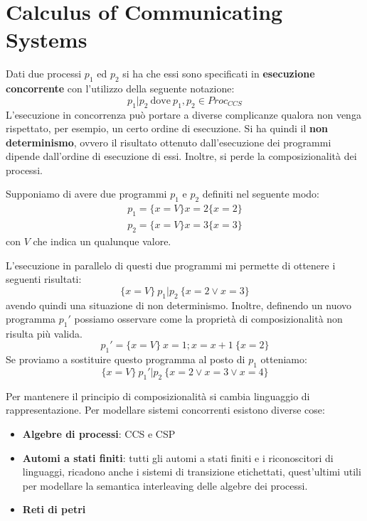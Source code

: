 \chapter{Calculus of Communicating Systems}
Dati due processi $p_1$ ed $p_2$ si ha che essi sono specificati in
\textbf{esecuzione concorrente} con l'utilizzo della seguente notazione:
\begin{equation}
    p_1 | p_2 \ \text{dove} \ p_1, p_2 \in Proc_{CCS}
\end{equation}
L'esecuzione in concorrenza può portare a diverse complicanze qualora non venga
rispettato, per esempio, un certo ordine di esecuzione. Si ha quindi il
\textbf{non determinismo}, ovvero il risultato ottenuto dall'esecuzione dei
programmi dipende dall'ordine di esecuzione di essi. Inoltre, si perde la
composizionalità dei processi.
\begin{esempio}
    Supponiamo di avere due programmi $p_1$ e $p_2$ definiti nel seguente
    modo:
    \begin{equation}
        \begin{aligned}
            p_1 =\{x = V\} x = 2 \{x = 2\} \\
            p_2 =\{x = V\} x = 3 \{x = 3\}
        \end{aligned}
    \end{equation}
    con $V$ che indica un qualunque valore.

    L'esecuzione in parallelo di questi due programmi mi permette di ottenere i
    seguenti risultati:
    \begin{equation}
        \{x = V\} \ p_1 | p_2 \ \{x = 2 \lor x = 3\}
    \end{equation}
    avendo quindi una situazione di non determinismo. Inoltre, definendo un nuovo
    programma $p_1'$ possiamo osservare come la proprietà di composizionalità non
    risulta più valida.
    \begin{equation}
        p_1' = \{x = V\} \ x = 1; x = x + 1 \ \{x = 2\}
    \end{equation}
    Se proviamo a sostituire questo programma al posto di $p_1$ otteniamo:
    \begin{equation}
        \{x = V\} \ p_1' | p_2 \ \{x = 2 \lor x = 3 \lor x = 4\}
    \end{equation}
\end{esempio}
Per mantenere il principio di composizionalità si cambia linguaggio di
rappresentazione. Per modellare sistemi concorrenti esistono diverse cose:
\begin{itemize}
    \item \textbf{Algebre di processi}: CCS e CSP
    \item \textbf{Automi a stati finiti}: tutti gli automi a stati finiti e i
          riconoscitori di linguaggi, ricadono anche i sistemi di transizione
          etichettati, quest'ultimi utili per modellare la semantica interleaving
          delle algebre dei processi.
    \item \textbf{Reti di petri}
\end{itemize}
